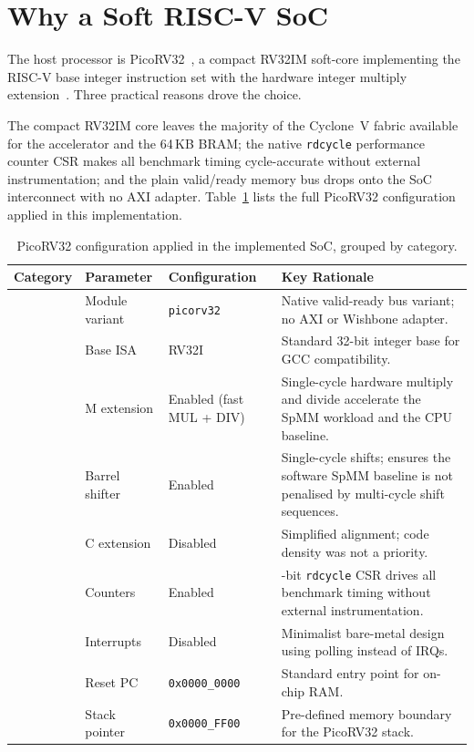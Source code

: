


\section{Why a Soft RISC-V SoC}
The host processor is PicoRV32~\citep{picorv32}, a compact RV32IM soft-core
implementing the RISC-V base integer instruction set with the hardware integer
multiply extension~\citep{riscv_isa}. Three practical reasons drove the
choice.

The compact RV32IM core leaves the majority of the Cyclone~V fabric
available for the accelerator and the 64\,KB BRAM; the native
\texttt{rdcycle} performance counter CSR makes all benchmark timing
cycle-accurate without external instrumentation; and the plain
valid/ready memory bus drops onto the SoC interconnect with no AXI
adapter. Table~\ref{tab:picorv32-config} lists the full PicoRV32
configuration applied in this implementation.

\begin{table}[htbp]
  \centering
  \small
  \setlength{\tabcolsep}{4pt}
  \begin{tabular}{>{\raggedright\arraybackslash}p{2.5cm}%
                  >{\raggedright\arraybackslash}p{2.6cm}%
                  >{\raggedright\arraybackslash}p{2.4cm}%
                  >{\raggedright\arraybackslash}p{5.9cm}}
  \toprule
  Category & Parameter & Configuration & Key Rationale \\
  \midrule
  \multirow{5}{=}{\textbf{Processor core}}
    & Module variant  & \texttt{picorv32} & Native valid-ready bus variant; no AXI or Wishbone adapter. \\[2pt]
    & Base ISA        & RV32I    & Standard 32-bit integer base for GCC compatibility. \\[2pt]
    & M extension     & Enabled (fast MUL + DIV) & Single-cycle hardware multiply and divide accelerate the SpMM workload and the CPU baseline. \\[2pt]
    & Barrel shifter  & Enabled  & Single-cycle shifts; ensures the software SpMM baseline is not penalised by multi-cycle shift sequences. \\[2pt]
    & C extension     & Disabled & Simplified alignment; code density was not a priority. \\
  \midrule
  \multirow{2}{=}{\textbf{System logic}}
    & Counters      & Enabled  & 32-bit \texttt{rdcycle} CSR drives all benchmark timing without external instrumentation. \\[2pt]
    & Interrupts    & Disabled & Minimalist bare-metal design using polling instead of IRQs. \\
  \midrule
  \multirow{2}{=}{\textbf{Memory map}}
    & Reset PC       & \texttt{0x0000\_0000} & Standard entry point for on-chip RAM. \\[2pt]
    & Stack pointer  & \texttt{0x0000\_FF00} & Pre-defined memory boundary for the PicoRV32 stack. \\
  \bottomrule
  \end{tabular}
  \caption{PicoRV32 configuration applied in the implemented SoC,
           grouped by category.}
  \label{tab:picorv32-config}
\end{table}

